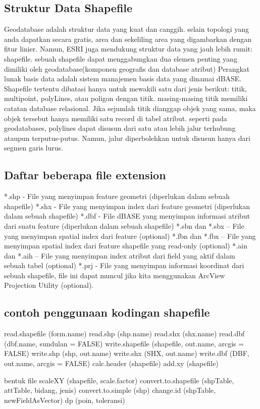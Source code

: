 \subsection{Struktur Data Shapefile}
Geodatabase adalah struktur data yang kuat dan canggih. selain topologi yang anda dapatkan secara 
gratis, area dan sekeliling area yang digambarkan dengan fitur linier. Namun, ESRI juga mendukung 
struktur data yang jauh lebih rumit: shapefile. sebuah shapefile dapat menggabungkan dua elemen 
penting yang dimiliki oleh geodatabase(komponen geografis dan database atribut) Perangkat lunak 
basis data adalah sistem manajemen basis data yang dinamai dBASE. Shapefile tertentu dibatasi hanya untuk mewakili satu dari jenis berikut: titik, multipoint, polyLines, atau poligon dengan titik. masing-masing titik memiliki catatan database relasional. Jika sejumlah titik dianggap objek yang sama, maka objek tersebut hanya memiliki satu record di tabel atribut. seperti pada geodatabases, polylines dapat disusun dari satu atau lebih jalur terhubung ataupun terputus-putus. Namun, jalur diperbolehkan untuk disusun hanya dari segmen garis lurus.

\subsection{Daftar beberapa file extension}
*.shp - File yang menyimpan feature geometri (diperlukan dalam sebuah shapefile) 
*.shx - File yang menyimpan index dari feature geometri (diperlukan dalam sebuah shapefile) 
*.dbf - File dBASE yang menyimpan informasi atribut dari suatu feature (diperlukan dalam sebuah shapefile) 
*.sbn dan *.sbx – File yang menyimpan spatial index dari feature (optional) 
*.fbn dan *.fbx – File yang menyimpan spatial index dari feature shapefile yang read-only (optional) 
*.ain dan *.aih – File yang menyimpan index atribut dari field yang aktif dalam sebuah tabel (optional) 
*.prj - File yang menyimpan informasi koordinat dari sebuah shapefile, file ini dapat muncul jika kita menggunakan ArcView Projection Utility (optional).

\subsection{contoh penggunaan kodingan shapefile}
read.shapefile (form.name) read.shp
(shp.name) read.shx (shx.name)
read.dbf (dbf.name, sundulan = FALSE)
write.shapefile (shapefile, out.name, arcgis = FALSE) write.shp (shp,
out.name) write.shx (SHX, out.name)
write.dbf (DBF, out.name, arcgis = FALSE) calc.header
(shapefile) add.xy (shapefile)

bentuk file
scaleXY (shapefile, scale.factor)
convert.to.shapefile (shpTable, attTable, bidang, jenis) convert.to.simple
(shp)
change.id (shpTable, newFieldAsVector) dp (poin,
toleransi)

